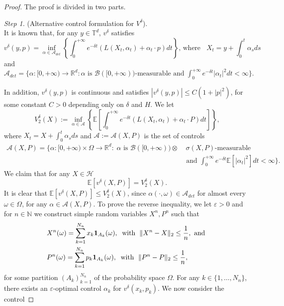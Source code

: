 \documentclass[reqno,11pt]{amsart}
\numberwithin{equation}{section}
\newcommand{\be}{\begin{equation}}
\newcommand{\ee}{\end{equation}}
\newcommand{\R}{\mathbb{R}} %
\newcommand{\e}{\varepsilon}
\newcommand{\T}{\mathbb{T}}
\newcommand{\nd}{\noindent}
\begin{document}
\begin{proof} The proof is divided in two parts.
\vspace{1mm}

\nd
\textit{Step 1.} (Alternative control formulation for $V^\delta$).\\
    It is known that, for any $y \in \T^d$, $v^\delta$ satisfies
    $$v^\delta(y,p)=\inf_{\alpha\in \mathcal{A}_{det}}\left\{ \int_0^{+\infty} e^{-\delta t}\left(L(X_t,\alpha_t )+\alpha_t\cdot p\right)dt\right\}\text{, where }\;\;X_t=y+\int_0^t\alpha_sds$$
    and $\mathcal{A}_{det}=\{\alpha:[0,+\infty)\to \R^d: \alpha\text{ is }\mathcal{B}([0,+\infty))\text{-measurable and }\int_0^{+\infty}e^{-\delta t}|\alpha_t|^2dt<\infty\}.$

    \nd
    In addition, $v^\delta(y,p)$ is continuous and satisfies $|v^\delta(y,p)|\le C(1+|p|^2)$, for some constant $C>0$ depending only on $\delta$ and $H$. We let
    $$V_2^\delta(X):=\inf_{\alpha\in \mathcal{A}}\left\{ \mathbb{E}\left[\int_0^{+\infty}e^{-\delta t}\left( L(X_t,\alpha_t) +\alpha_t\cdot P\right)dt\right] \right\},$$
    where $X_t= X+\int_0^t\alpha_s ds$ and $\mathcal{A}:=\mathcal{A}(X,P)$ is the set  of controls
    \begin{align*}
        \mathcal{A}(X,P)=\bigg\{ \alpha\colon [0,+\infty)\times \Omega\to \R^d:\; \alpha\text{ is }\mathcal{B}([0,+\infty))\otimes &\;\sigma(X,P)\text{-measurable}\\
        &\text{ and }\int_0^{+\infty}e^{-\delta t}\mathbb{E}[|\alpha_t|^2]dt<\infty\bigg\}.
    \end{align*}
    We claim that for any $X\in\mathcal{H}$
    \be\label{claim}\nonumber
    \mathbb{E}\left[ v^\delta(X,P) \right]=V_2^\delta(X).
    \ee
    It is clear that $\mathbb{E}[v^\delta(X,P)]\le V_2^\delta(X)$, since $\alpha(\cdot,\omega)\in \mathcal{A}_{det}$ for almost every $\omega\in \Omega$, for any $\alpha\in \mathcal{A}(X,P)$. To prove the reverse inequality, we let $\e>0$ and for $n\in \mathbb{N}$ we construct simple random variables $X^n,P^n$ such that
    \begin{align*}
        &X^n(\omega)=\sum_{k=1}^{N_n}x_k{\bf 1}_{A_k}(\omega),\;\;\text{with }\;\|X^n-X\|_2\le \frac{1}{n},\text{ and }\\
        & P^n(\omega)=\sum_{k=1}^{N_n}p_k{\bf 1}_{A_k}(\omega),\;\;\text{with }\;\|P^n-P\|_2\le \frac{1}{n},
    \end{align*}
    for some partition $(A_k)_{k=1}^{N_n}$ of the probability space $\Omega$. For any $k\in \{1,\ldots,N_n\}$, there exists an $\e$-optimal control $\alpha_k$ for $v^\delta(x_k,p_k)$. We now consider the control

\end{proof}
\end{document}
